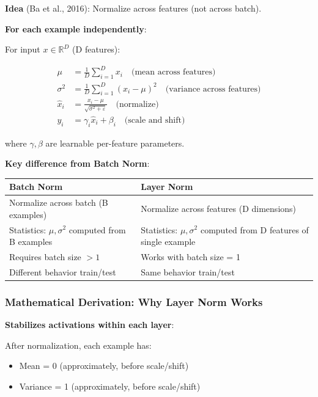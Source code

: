 \documentclass[11pt,oneside]{book}
\begin{document}
\textbf{Idea} (Ba et al., 2016): Normalize across features (not across batch).

\textbf{For each example independently}:

For input $x \in \mathbb{R}^D$ (D features):

\begin{align*}
\mu &= \frac{1}{D} \sum_{i=1}^D x_i \quad \text{(mean across features)} \\
\sigma^2 &= \frac{1}{D} \sum_{i=1}^D (x_i - \mu)^2 \quad \text{(variance across features)} \\
\hat{x}_i &= \frac{x_i - \mu}{\sqrt{\sigma^2 + \varepsilon}} \quad \text{(normalize)} \\
y_i &= \gamma_i \hat{x}_i + \beta_i \quad \text{(scale and shift)}
\end{align*}

where $\gamma, \beta$ are learnable per-feature parameters.

\textbf{Key difference from Batch Norm}:

\begin{center}
\begin{tabular}{ll}
\hline
\textbf{Batch Norm} & \textbf{Layer Norm} \\
\hline
Normalize across batch (B examples) & Normalize across features (D dimensions) \\
Statistics: $\mu, \sigma^2$ computed from B examples & Statistics: $\mu, \sigma^2$ computed from D features of single example \\
Requires batch size $> 1$ & Works with batch size = 1 \\
Different behavior train/test & Same behavior train/test \\
\hline
\end{tabular}
\end{center}

\subsubsection{Mathematical Derivation: Why Layer Norm Works}

\textbf{Stabilizes activations within each layer}:

After normalization, each example has:
\begin{itemize}
\item Mean = 0 (approximately, before scale/shift)
\item Variance = 1 (approximately, before scale/shift)
\end{itemize}
\end{document}
